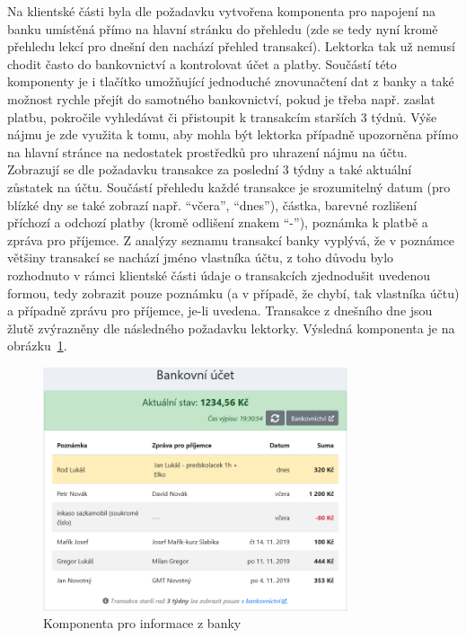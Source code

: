 Na klientské části byla dle požadavku vytvořena komponenta pro napojení na banku umístěná přímo na hlavní stránku do přehledu (zde se tedy nyní kromě přehledu lekcí pro dnešní den nachází přehled transakcí). Lektorka tak už nemusí chodit často do bankovnictví a kontrolovat účet a platby. Součástí této komponenty je i tlačítko umožňující jednoduché znovunačtení dat z banky a také možnost rychle přejít do samotného bankovnictví, pokud je třeba např. zaslat platbu, pokročile vyhledávat či přistoupit k transakcím starších 3 týdnů. Výše nájmu je zde využita k tomu, aby mohla být lektorka případně upozorněna přímo na hlavní stránce na nedostatek prostředků pro uhrazení nájmu na účtu. Zobrazují se dle požadavku transakce za poslední 3 týdny a také aktuální zůstatek na účtu. Součástí přehledu každé transakce je srozumitelný datum (pro blízké dny se také zobrazí např. \enquote{včera}, \enquote{dnes}), částka, barevné rozlišení příchozí a odchozí platby (kromě odlišení znakem \enquote{-}), poznámka k platbě a zpráva pro příjemce. Z analýzy seznamu transakcí banky vyplývá, že v poznámce většiny transakcí se nachází jméno vlastníka účtu, z toho důvodu bylo rozhodnuto v rámci klientské části údaje o transakcích zjednodušit uvedenou formou, tedy zobrazit pouze poznámku (a v případě, že chybí, tak vlastníka účtu) a případně zprávu pro příjemce, je-li uvedena. Transakce z dnešního dne jsou žlutě zvýrazněny dle následného požadavku lektorky. Výsledná komponenta je na obrázku~\ref{fig:ui-screen-banka}.

\begin{figure}[h]\centering
    \includegraphics[width=0.8\textwidth]{img/ui-screen-banka.png}
    \caption{Komponenta pro informace z banky}\label{fig:ui-screen-banka}
\end{figure}

